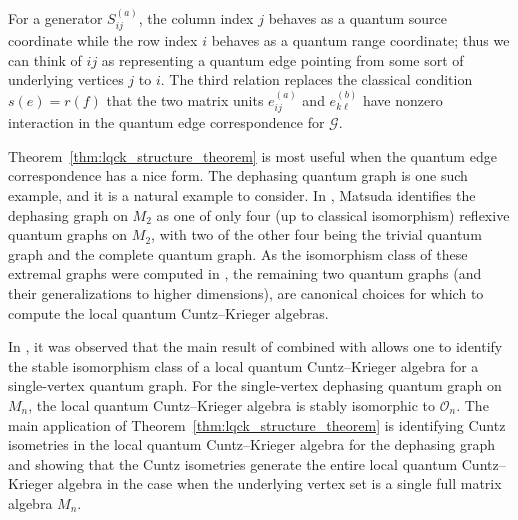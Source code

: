 \documentclass[11pt]{article}
\theoremstyle{plain}
\theoremstyle{nonumberplain}
\theoremstyle{plain}
\theoremstyle{nonumberplain}
\newcommand\1{{\bf 1}}
\newcommand\cG{{\mathcal G}}
\newcommand\cO{{\mathcal O}}
\newcommand{\<}{\left\langle}
\renewcommand{\>}{\right\rangle}
\begin{document}
For a generator $S_{ij}^{(a)}$, the column index $j$ behaves as a quantum source coordinate while the row index $i$ behaves as a quantum range coordinate; thus we can think of $ij$ as representing a quantum edge pointing from some sort of underlying vertices $j$ to $i$. The third relation replaces the classical condition $s(e)=r(f)$ that the two matrix units $e_{ij}^{(a)}$ and $e_{k\ell}^{(b)}$ have nonzero interaction in the quantum edge correspondence for $\cG$.

Theorem~\ref{thm:lqck_structure_theorem} is most useful when the quantum edge correspondence has a nice form. The dephasing quantum graph is one such example, and it is a natural example to consider. In \cite[Theorem 3.1]{Matsuda}, Matsuda identifies the dephasing graph on $M_2$ as one of only four (up to classical isomorphism) reflexive quantum graphs on $M_2$, with two of the other four being the trivial quantum graph and the complete quantum graph. As the isomorphism class of these extremal graphs were computed in \cite{BHINW23}, the remaining two quantum graphs (and their generalizations to higher dimensions), are canonical choices for which to compute the local quantum Cuntz--Krieger algebras.%


In \cite{HIN25}, it was observed that the main result of \cite{Marrero-Muhly05} combined with \cite[Corollary 2.6]{BHINW23} allows one to identify the stable isomorphism class of a local quantum Cuntz--Krieger algebra for a single-vertex quantum graph. For the single-vertex dephasing quantum graph on $M_n$, the local quantum Cuntz--Krieger algebra is stably isomorphic to $\cO_n$. The main application of Theorem~\ref{thm:lqck_structure_theorem} is identifying Cuntz isometries in the local quantum Cuntz--Krieger algebra for the dephasing graph and showing that the Cuntz isometries generate the entire local quantum Cuntz--Krieger algebra in the case when the underlying vertex set is a single full matrix algebra $M_n$.
\end{document}
